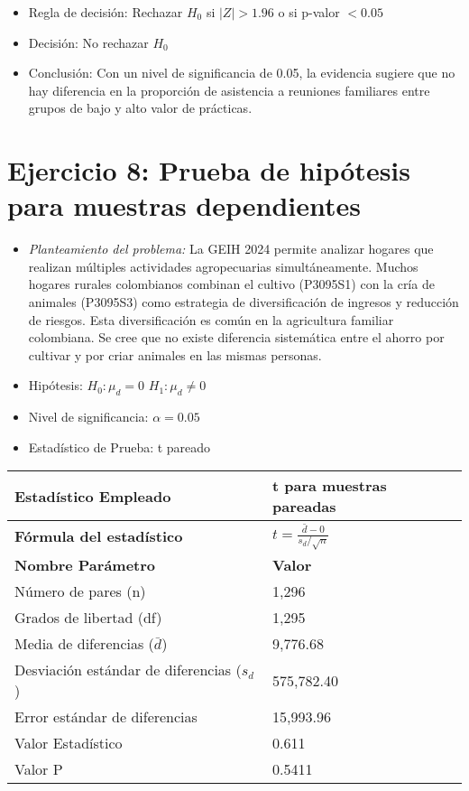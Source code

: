 \documentclass[12pt,a4paper]{article}
\begin{document}
\begin{itemize}
    \item Regla de decisión: Rechazar $H_0$ si $|Z| > 1.96$ o si p-valor $< 0.05$
    \item Decisión: No rechazar $H_0$
    \item Conclusión: Con un nivel de significancia de 0.05, la evidencia sugiere que no hay diferencia en la proporción de asistencia a reuniones familiares entre grupos de bajo y alto valor de prácticas.
\end{itemize}

\section*{Ejercicio 8: Prueba de hipótesis para muestras dependientes}
\begin{itemize}
    \item \textit{Planteamiento del problema:} La GEIH 2024 permite analizar hogares que realizan múltiples actividades agropecuarias simultáneamente. Muchos hogares rurales colombianos combinan el cultivo (P3095S1) con la cría de animales (P3095S3) como estrategia de diversificación de ingresos y reducción de riesgos. Esta diversificación es común en la agricultura familiar colombiana. Se cree que no existe diferencia sistemática entre el ahorro por cultivar y por criar animales en las mismas personas.
    \item Hipótesis: \quad $H_{0}: \mu_d = 0$ \hspace{2cm} $H_{1}: \mu_d \neq 0$
    \item Nivel de significancia: $\alpha = 0.05$
    \item Estadístico de Prueba: t pareado
\end{itemize}

\begin{tabular}{|m{7cm}|m{7cm}|}
\hline
\textbf{Estadístico Empleado} & t para muestras pareadas \\ \hline
\textbf{Fórmula del estadístico} & $t = \frac{\bar{d} - 0}{s_d/\sqrt{n}}$ \\ \hline
\textbf{Nombre Parámetro} & \textbf{Valor} \\ \hline
Número de pares (n) & 1,296 \\ \hline
Grados de libertad (df) & 1,295 \\ \hline
Media de diferencias ($\bar{d}$) & 9,776.68 \\ \hline
Desviación estándar de diferencias ($s_d$) & 575,782.40 \\ \hline
Error estándar de diferencias & 15,993.96 \\ \hline
Valor Estadístico & 0.611 \\ \hline
Valor P & 0.5411 \\ \hline
\end{tabular}
\end{document}
